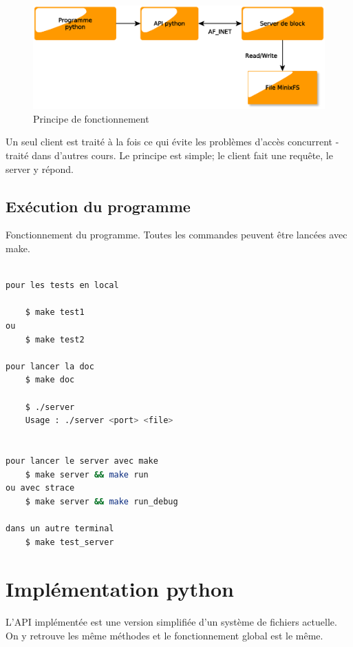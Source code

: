 \documentclass[a4paper,12pt]{article}
\begin{document}
\begin{figure}[H]
\begin{center}
\includegraphics[scale=.6]{imgs/schema_client_server}
\caption{Principe de fonctionnement}
\label{fig:Architecture client server}
\end{center}
\end{figure}


Un seul client est traité à la fois ce qui évite les problèmes d'accès concurrent - traité dans d'autres cours. Le principe est simple; le client fait une requête, le server y répond.\\


\subsection{Exécution du programme}

Fonctionnement du programme. Toutes les commandes peuvent être lancées avec make.\\

\begin{lstlisting}[language=bash,caption={lancer le server}]

pour les tests en local

	$ make test1
ou
	$ make test2
	
pour lancer la doc
	$ make doc

	$ ./server
	Usage : ./server <port> <file>
	
	
pour lancer le server avec make
	$ make server && make run
ou avec strace
	$ make server && make run_debug
	
dans un autre terminal
	$ make test_server

\end{lstlisting}


\section{Implémentation python}

L'API implémentée est une version simplifiée d'un système de fichiers actuelle. On y retrouve les même méthodes et le fonctionnement global est le même.\\
\end{document}
